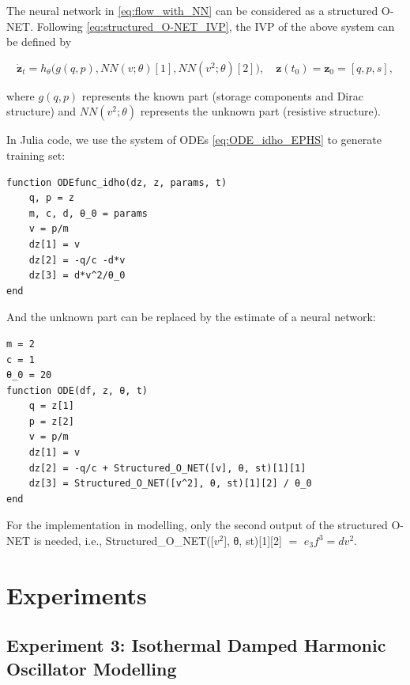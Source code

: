 \documentclass[
	parskip, 			   %
	twoside, 			   %
	DIV=14, 			   %
	BCOR=15.0mm, 		   %
	headsepline, 		   %
	open=right, 		   %
	captions=tableheading, %
	bibliography=totoc,    %
	numbers=noenddot       %
]{scrreprt}
\begin{document}
The neural network in \ref{eq:flow_with_NN} can be considered as a structured O-NET. Following \ref{eq:structured_O-NET_IVP}, the IVP of the above system can be defined by

\begin{equation}
    \label{eq:structured_O-NET_compositional_IVP}
    \dot{\mathbf{z}}_t = h_{\theta} \big(g(q, p), NN(v; \theta)[1], NN(v^2; \theta)[2] \big), \quad \mathbf{z}(t_{0}) = \mathbf{z}_{0} = [q, p, s],
\end{equation}

where $g(q, p)$ represents the known part (storage components and Dirac structure) and $NN(v^2; \theta)$ represents the unknown part (resistive structure).

In Julia code, we use the system of ODEs \ref{eq:ODE_idho_EPHS} to generate training set:

\begin{verbatim}
function ODEfunc_idho(dz, z, params, t)
    q, p = z
    m, c, d, θ_0 = params
    v = p/m
    dz[1] = v
    dz[2] = -q/c -d*v
    dz[3] = d*v^2/θ_0
end
\end{verbatim}

And the unknown part can be replaced by the estimate of a neural network:

\begin{verbatim}
m = 2
c = 1
θ_0 = 20
function ODE(df, z, θ, t)
    q = z[1]
    p = z[2]
    v = p/m
    dz[1] = v
    dz[2] = -q/c + Structured_O_NET([v], θ, st)[1][1]
    dz[3] = Structured_O_NET([v^2], θ, st)[1][2] / θ_0
end
\end{verbatim}

For the implementation in modelling, only the second output of the structured O-NET is needed, i.e., Structured\_O\_NET([$v^2$], θ, st)[1][2] $=$ $e_3 f^3 = dv^2$.

\section{Experiments}
\subsection{Experiment 3: Isothermal Damped Harmonic Oscillator Modelling}
\end{document}
